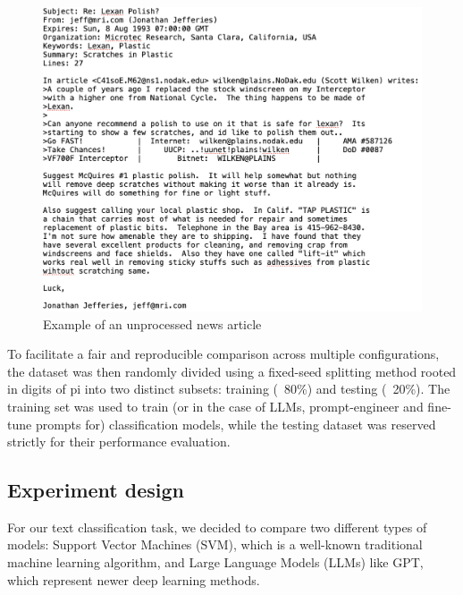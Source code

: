 \begin{figure}[h!]
    \centering
    \includegraphics[width=0.8\linewidth]{img/fig2.png}
    \caption{Example of an unprocessed news article}
    \label{fig:enter-label}
\end{figure}

To facilitate a fair and reproducible comparison across multiple configurations, the dataset was then randomly divided using a fixed-seed splitting method rooted in digits of pi into two distinct subsets: training (~80\%) and testing (~20\%). The training set was used to train (or in the case of LLMs, prompt-engineer and fine-tune prompts for) classification models, while the testing dataset was reserved strictly for their performance evaluation.


\subsection{Experiment design}
%
%
For our text classification task, we decided to compare two different types of models: Support Vector Machines (SVM), which is a well-known traditional machine learning algorithm, and Large Language Models (LLMs) like GPT, which represent newer deep learning methods.

